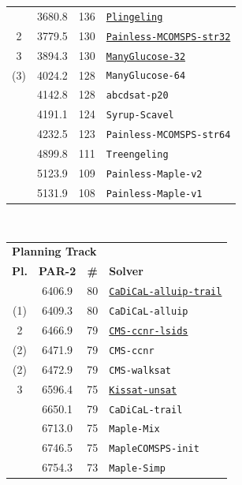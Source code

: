 \documentclass{elsarticle}
\newcommand{\solver}[1]{\texttt{#1}}
\newcommand{\solbert}[1]{\underline{\solver{#1}}}
\begin{document}
\begin{table}
\begin{tabularx}{.5\linewidth}{cccX}
\arrayrulecolor{lightgray}\hline
 1 & 3680.8 & 136 & \solbert{Plingeling} \\
 2 & 3779.5 & 130 & \solbert{Painless-MCOMSPS-str32} \\
 3 & 3894.3 & 130 & \solbert{ManyGlucose-32} \\
(3)& 4024.2 & 128 & \solver{ManyGlucose-64} \\
   & 4142.8 & 128 & \solver{abcdsat-p20} \\
   & 4191.1 & 124 & \solver{Syrup-Scavel} \\
   & 4232.5 & 123 & \solver{Painless-MCOMSPS-str64} \\
   & 4899.8 & 111 & \solver{Treengeling} \\
   & 5123.9 & 109 & \solver{Painless-Maple-v2} \\
   & 5131.9 & 108 & \solver{Painless-Maple-v1}%
\end{tabularx}
~\\[1em]
\begin{tabularx}{.47\linewidth}{cccX}
\multicolumn{4}{l}{\bf Planning Track}\\
\bf Pl. & \bf PAR-2 & \bf \# & \bf Solver \\
\arrayrulecolor{lightgray}\hline   
 1    & 6406.9 & 80 & \solbert{CaDiCaL-alluip-trail} \\
(1)   & 6409.3 & 80 & \solver{CaDiCaL-alluip} \\
 2    & 6466.9 & 79 & \solbert{CMS-ccnr-lsids} \\
(2)   & 6471.9 & 79 & \solver{CMS-ccnr} \\
(2)   & 6472.9 & 79 & \solver{CMS-walksat} \\
 3    & 6596.4 & 75 & \solbert{Kissat-unsat} \\
      & 6650.1 & 79 & \solver{CaDiCaL-trail} \\
      & 6713.0 & 75 & \solver{Maple-Mix} \\
      & 6746.5 & 75 & \solver{MapleCOMSPS-init} \\
      & 6754.3 & 73 & \solver{Maple-Simp}%
\end{tabularx}\quad%

\end{table}
\end{document}
